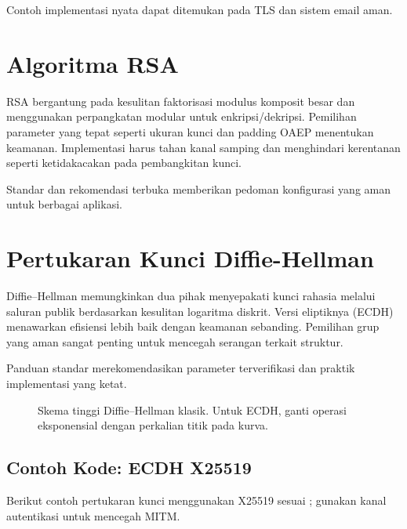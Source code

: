 \documentclass[../main.tex]{subfiles}
\begin{document}
Contoh implementasi nyata dapat ditemukan pada TLS dan sistem email aman.

\section{Algoritma RSA}
RSA bergantung pada kesulitan faktorisasi modulus komposit besar dan menggunakan perpangkatan modular untuk enkripsi/dekripsi. Pemilihan parameter yang tepat seperti ukuran kunci dan padding OAEP menentukan keamanan. Implementasi harus tahan kanal samping dan menghindari kerentanan seperti ketidakacakan pada pembangkitan kunci.

Standar dan rekomendasi terbuka memberikan pedoman konfigurasi yang aman untuk berbagai aplikasi.

\section{Pertukaran Kunci Diffie-Hellman}
Diffie--Hellman memungkinkan dua pihak menyepakati kunci rahasia melalui saluran publik berdasarkan kesulitan logaritma diskrit. Versi eliptiknya (ECDH) menawarkan efisiensi lebih baik dengan keamanan sebanding. Pemilihan grup yang aman sangat penting untuk mencegah serangan terkait struktur.

Panduan standar merekomendasikan parameter terverifikasi dan praktik implementasi yang ketat.

\begin{figure}[h]
\centering
{}
\caption{Skema tinggi Diffie--Hellman klasik. Untuk ECDH, ganti operasi eksponensial dengan perkalian titik pada kurva.}
\label{fig:dh}
\end{figure}

\subsection{Contoh Kode: ECDH X25519}
Berikut contoh pertukaran kunci menggunakan X25519 sesuai \textcite{rfc7748}; gunakan kanal autentikasi untuk mencegah MITM.
\end{document}
